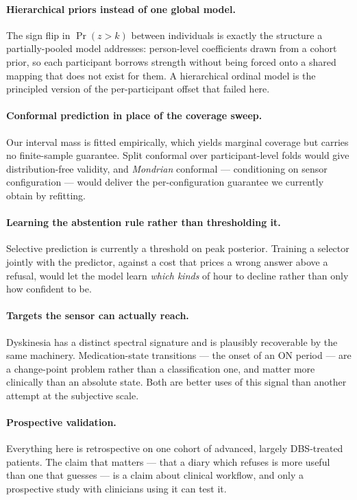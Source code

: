 \documentclass[11pt,a4paper]{article}
\begin{document}
\paragraph{Hierarchical priors instead of one global model.}
The sign flip in $\Pr(z>k)$ between individuals is exactly the structure a
partially-pooled model addresses: person-level coefficients drawn from a cohort
prior, so each participant borrows strength without being forced onto a shared
mapping that does not exist for them. A hierarchical ordinal model is the
principled version of the per-participant offset that failed here.

\paragraph{Conformal prediction in place of the coverage sweep.}
Our interval mass is fitted empirically, which yields marginal coverage but
carries no finite-sample guarantee. Split conformal over participant-level
folds would give distribution-free validity, and \emph{Mondrian} conformal ---
conditioning on sensor configuration --- would deliver the per-configuration
guarantee we currently obtain by refitting.

\paragraph{Learning the abstention rule rather than thresholding it.}
Selective prediction is currently a threshold on peak posterior. Training a
selector jointly with the predictor, against a cost that prices a wrong answer
above a refusal, would let the model learn \emph{which kinds} of hour to
decline rather than only how confident to be.

\paragraph{Targets the sensor can actually reach.}
Dyskinesia has a distinct spectral signature and is plausibly recoverable by the
same machinery. Medication-state transitions --- the onset of an ON period ---
are a change-point problem rather than a classification one, and matter more
clinically than an absolute state. Both are better uses of this signal than
another attempt at the subjective scale.

\paragraph{Prospective validation.} Everything here is retrospective on one
cohort of advanced, largely DBS-treated patients. The claim that matters ---
that a diary which refuses is more useful than one that guesses --- is a claim
about clinical workflow, and only a prospective study with clinicians using it
can test it.
\end{document}
